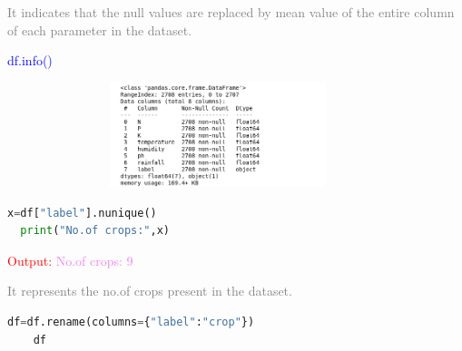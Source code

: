 \textcolor{gray}{\hspace{0.5cm}It indicates that the null values are replaced by mean value of the entire column of each parameter in the dataset.}

\hspace{2in}\textcolor{blue}{df.info()}

\begin{figure}[ht]
    \centering
    \includegraphics[width=4in,height=1.2in]{info1.png}
\end{figure}


\begin{lstlisting}[language=Python]
  x=df["label"].nunique()
  print("No.of crops:",x)  
\end{lstlisting}
\hspace{2in}\textcolor{red}{Output:}
\newline
\hspace{2in}\textcolor{violet}{No.of crops: 9}

\textcolor{grey}{\hspace{0.5cm}It represents the no.of crops  present in the dataset.}

\begin{lstlisting}[language=Python]
    df=df.rename(columns={"label":"crop"})
    df
\end{lstlisting}

